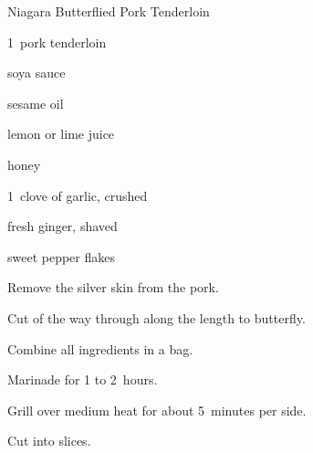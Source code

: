 \begin{recipe}{Niagara Butterflied Pork Tenderloin}{}{}

\begin{ingredients}
\item 1~pork tenderloin
\item \C{\quarter} soya sauce
\item {} sesame oil
\item {} lemon or lime juice
\item {} honey
\item 1~clove of garlic, crushed
\item {} fresh ginger, shaved
\item {} sweet pepper flakes
\end{ingredients}

\begin{directions}
\item Remove the silver skin from the pork.
\item Cut \threequarters{} of the way through along the length to butterfly.
\item Combine all ingredients in a bag.
\item Marinade for 1 to 2~hours.
\item Grill over medium heat for about 5~minutes per side.
\item Cut into slices.
\end{directions}

\end{recipe}
